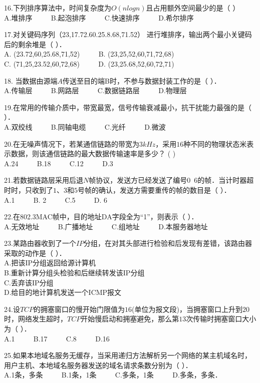 16.下列排序算法中，时间复杂度为$O(nlogn)$且占用额外空间最少的是（    ） \\
A.堆排序 $\qquad$ B.起泡排序 $\qquad$ C.快速排序 $\qquad$ D.希尔排序

17.对关键码序列（23,17.72.60.25.8.68,71.52） 进行堆排序，输出两个最小关键码后的剩余堆是（    ）． \\
A. (23.72,60,25.68,71,52) $\qquad$ B. (23,25,52,60,71,72,68) \\
C. (71,25,23.52,60,72,68) $\qquad$ D. (23,25.68,52,60,72,71)

18. 当数据由源端$A$传送至目的端B时，不参与数据封装工作的是（    ）． \\
A.传输层 $\qquad$ B.网路层 $\qquad$ C.数据链路层 $\qquad$ D.物理层

19.在常用的传输介质中，带宽最宽，信号传输衰减最小，抗干扰能力最强的是（    ）． \\
A.双绞线 $\qquad$ B.同轴电缆 $\qquad$ C.光纤 $\qquad$ D.微波

20.在无噪声情况下，若某通信链路的带宽为$3kHz$，采用$16$种不同的物理状态米表示数据，则该通信链路的最大数据传输速率是多少？ (    ) \\
A.24 $\qquad$ B.18 $\qquad$ C.12 $\qquad$ D.3

21.若数据链路层采用后退$N$帧协议，发送方已经发送了编号$0$~$6$的帧．当计时器超时时，只收到了$1$、$3$和$5$号帧的确认，发送方需要重传的帧的数目是（    ）． \\
A.1 $\qquad$ B. 2 $\qquad$ C.5 $\qquad$ D. 6

22.在802.3MAC帧中，目的地址DA字段全为“1”，则表示（    ）． \\
A.无效地址 $\qquad$ B.广播地址 $\qquad$ C.组地址 $\qquad$ D.本服务器地址

23.某路由器收到了一个$IP$分组，在对其头部进行检验和后发现有差错，该路由器采取的动作是（    ）． \\
A.把该IP分组返回给源计算机 \\
B.重新计算分组头检验和后继续转发该IP分组 \\
C.丢弃该IP分组 \\
D.给目的地计算机发送一个ICMP报文

24.设$TCP$的拥塞窗口的慢开始门限值为$16$(单位为报文段)，当拥塞窗口上升到$20$时，网络发生超时，$TCP$开始慢启动和拥塞避免，那么第$13$次传输时拥塞窗口大小为（    ）． \\
A.1 $\qquad$ B.17 $\qquad$ C.8 $\qquad$ D.16

25.如果本地域名服务无缓存，当采用递归方法解析另一个网络的某主机域名时，用户主机、本地域名服务器发送的域名请求条数分别为（    ）． \\
A.1条，多条 $\qquad$ B.1条，1条 $\qquad$ C.多条，1条 $\qquad$ D.多条，多条．


